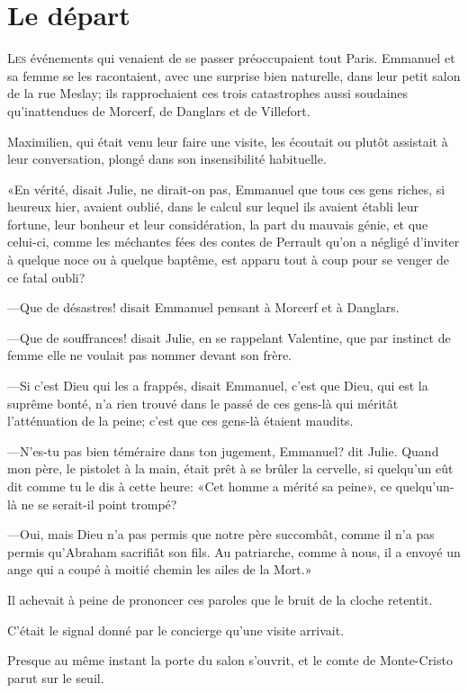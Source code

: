 \chapter{Le départ}

\lettrine{L}{es} événements qui venaient de se passer préoccupaient tout Paris. Emmanuel et sa femme se les racontaient, avec une surprise bien naturelle, dans leur petit salon de la rue Meslay; ils rapprochaient ces trois catastrophes aussi soudaines qu'inattendues de Morcerf, de Danglars et de Villefort. 

Maximilien, qui était venu leur faire une visite, les écoutait ou plutôt assistait à leur conversation, plongé dans son insensibilité habituelle. 

«En vérité, disait Julie, ne dirait-on pas, Emmanuel que tous ces gens riches, si heureux hier, avaient oublié, dans le calcul sur lequel ils avaient établi leur fortune, leur bonheur et leur considération, la part du mauvais génie, et que celui-ci, comme les méchantes fées des contes de Perrault qu'on a négligé d'inviter à quelque noce ou à quelque baptême, est apparu tout à coup pour se venger de ce fatal oubli? 

—Que de désastres! disait Emmanuel pensant à Morcerf et à Danglars. 

—Que de souffrances! disait Julie, en se rappelant Valentine, que par instinct de femme elle ne voulait pas nommer devant son frère. 

—Si c'est Dieu qui les a frappés, disait Emmanuel, c'est que Dieu, qui est la suprême bonté, n'a rien trouvé dans le passé de ces gens-là qui méritât l'atténuation de la peine; c'est que ces gens-là étaient maudits. 

—N'es-tu pas bien téméraire dans ton jugement, Emmanuel? dit Julie. Quand mon père, le pistolet à la main, était prêt à se brûler la cervelle, si quelqu'un eût dit comme tu le dis à cette heure: «Cet homme a mérité sa peine», ce quelqu'un-là ne se serait-il point trompé? 

—Oui, mais Dieu n'a pas permis que notre père succombât, comme il n'a pas permis qu'Abraham sacrifiât son fils. Au patriarche, comme à nous, il a envoyé un ange qui a coupé à moitié chemin les ailes de la Mort.» 

Il achevait à peine de prononcer ces paroles que le bruit de la cloche retentit. 

C'était le signal donné par le concierge qu'une visite arrivait. 

Presque au même instant la porte du salon s'ouvrit, et le comte de Monte-Cristo parut sur le seuil. 

